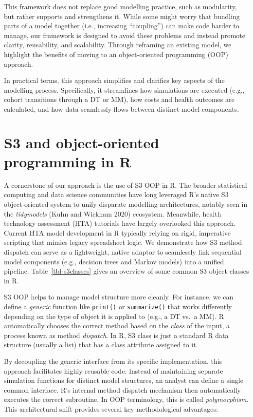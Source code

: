 \documentclass[
]{article}
\begin{document}
This framework does not replace good modelling practice, such as
modularity, but rather supports and strengthens it. While some might
worry that bundling parts of a model together (i.e., increasing
``coupling'') can make code harder to manage, our framework is designed
to avoid these problems and instead promote clarity, reusability, and
scalability. Through reframing an existing model, we highlight the
benefits of moving to an object-oriented programming (OOP) approach.

In practical terms, this approach simplifies and clarifies key aspects
of the modelling process. Specifically, it streamlines how simulations
are executed (e.g., cohort transitions through a DT or MM), how costs
and health outcomes are calculated, and how data seamlessly flows
between distinct model components.

\section{S3 and object-oriented programming in
R}\label{s3-and-object-oriented-programming-in-r}

A cornerstone of our approach is the use of S3 OOP in R. The broader
statistical computing and data science communities have long leveraged
R's native S3 object-oriented system to unify disparate modelling
architectures, notably seen in the \emph{tidymodels} (Kuhn and Wickham
2020) ecosystem. Meanwhile, health technology assessment (HTA) tutorials
have largely overlooked this approach. Current HTA model development in
R typically relying on rigid, imperative scripting that mimics legacy
spreadsheet logic. We demonstrate how S3 method dispatch can serve as a
lightweight, native adaptor to seamlessly link sequential model
components (e.g., decision trees and Markov models) into a unified
pipeline. Table~\ref{tbl-s3classes} gives an overview of some common S3
object classes in R.

S3 OOP helps to manage model structure more cleanly. For instance, we
can define a \emph{generic} function like \texttt{print()} or
\texttt{summarize()} that works differently depending on the type of
object it is applied to (e.g., a DT vs.~a MM). R automatically chooses
the correct method based on the \emph{class} of the input, a process
known as method \emph{dispatch}. In R, S3 class is just a standard R
data structure (usually a list) that has a class attribute assigned to
it.

By decoupling the generic interface from its specific implementation,
this approach facilitates highly reusable code. Instead of maintaining
separate simulation functions for distinct model structures, an analyst
can define a single common interface. R's internal method dispatch
mechanism then automatically executes the correct subroutine. In OOP
terminology, this is called \emph{polymorphism}. This architectural
shift provides several key methodological advantages:
\end{document}
